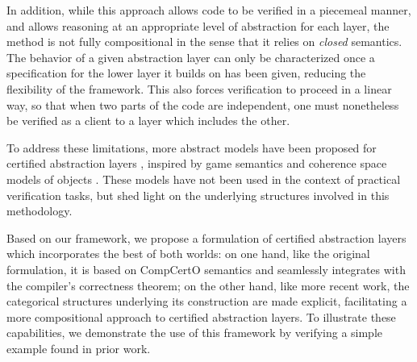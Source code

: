 \documentclass[acmsmall,screen,review,anonymous]{acmart}
\begin{document}
%

In addition,
while this approach allows code
to be verified in a piecemeal manner,
and allows reasoning at an appropriate level of abstraction
for each layer,
the method is not fully compositional
in the sense that it relies on \emph{closed} semantics.
The behavior of a given abstraction layer
can only be characterized
once a specification for the lower layer it builds on has been given,
reducing the flexibility of the framework.
This also forces verification to proceed
in a linear way,
so that when two parts of the code
are independent,
one must nonetheless be verified
as a client to a layer which includes the other.

To address these limitations,
more abstract models have been proposed
for certified abstraction layers
\cite{rbgs-cal,popl22},
inspired by game semantics and
coherence space models of objects \cite{objsem}.
These models have not been used
in the context of practical verification tasks,
but shed light on the underlying structures
involved in this methodology.

Based on our framework,
we propose a formulation of certified abstraction layers
which incorporates the best of both worlds:
on one hand,
like the original formulation,
it is based on CompCertO semantics
and seamlessly integrates
with the compiler's correctness theorem;
on the other hand,
like more recent work,
the categorical structures underlying its construction
are made explicit,
facilitating a more compositional approach
to certified abstraction layers.
To illustrate these capabilities,
we demonstrate the use of this framework
by verifying a simple example
found in prior work.

\end{document}
